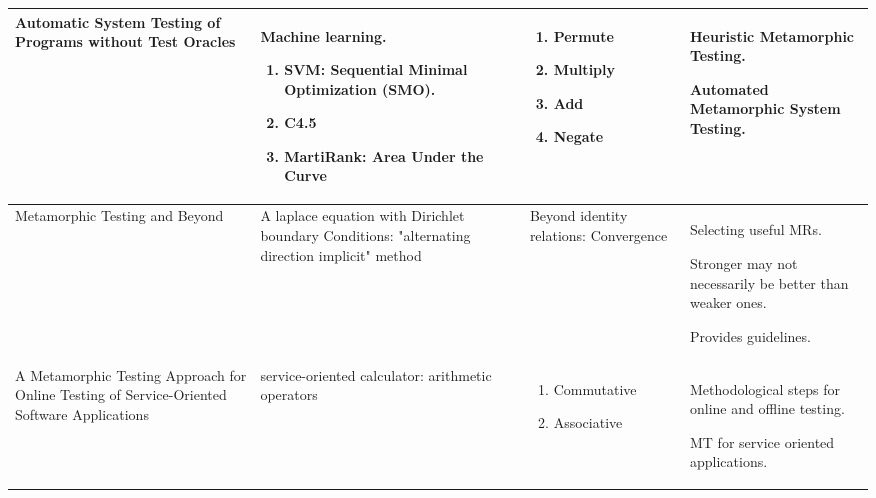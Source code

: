 \begin{singlespace}
\begin{longtable}[c]{| p{3cm} | p{4cm} | p{3.5cm} | p{4cm} |}
  \hline

  Automatic System Testing of Programs without Test Oracles             &
  Machine learning.
  \begin{enumerate}
    \item SVM: Sequential Minimal Optimization (SMO).
    \item C4.5
    \item MartiRank: Area Under the Curve
  \end{enumerate}                                        &
  \begin{enumerate}
    \item Permute
    \item Multiply
    \item Add
    \item Negate
  \end{enumerate}                                          &
  Heuristic Metamorphic Testing.\par\medskip
  Automated Metamorphic System Testing.  \\

  \hline

  Metamorphic Testing and Beyond             &
  A laplace equation with Dirichlet boundary Conditions: "alternating direction implicit" method                                        &
  Beyond identity relations: Convergence                                          &
  Selecting useful MRs. \par\medskip
  Stronger may not necessarily be better than weaker ones. \par\medskip
  Provides guidelines.  \\

  \hline

  A Metamorphic Testing Approach for Online Testing of Service-Oriented Software Applications             &
  service-oriented calculator: arithmetic operators                                        &
  \begin{enumerate}
    \item Commutative
    \item Associative
  \end{enumerate}                                         &
  Methodological steps for online and offline testing. \par\medskip
  MT for service oriented applications.  \\

  \hline

 \end{longtable}
\end{singlespace}
